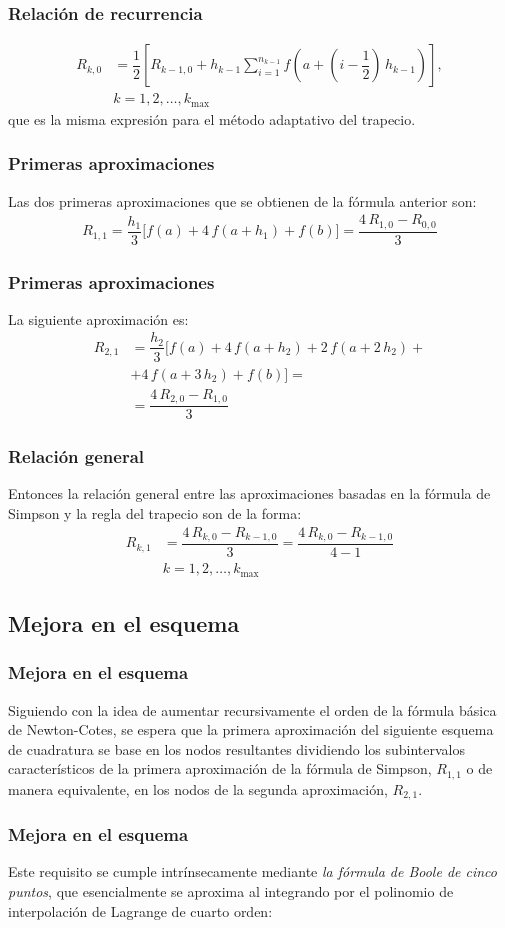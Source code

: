 \begin{frame}
\frametitle{Relación de recurrencia}
\begin{align*}
R_{k,0} &= \dfrac{1}{2} \left[ R_{k-1, 0} + h_{k-1} \sum_{i=1}^{n_{k-1}} f  \left(a + \left( i - \dfrac{1}{2} \right) \, h_{k-1} \right) \right], \\[0.5em]
&k = 1, 2,\ldots, k_{\max}
\end{align*}
que es la misma expresión para el método adaptativo del trapecio.
\end{frame}
\begin{frame}
\frametitle{Primeras aproximaciones}
Las dos primeras aproximaciones que se obtienen de la fórmula anterior son:
\begin{align*}
R_{1, 1} = \dfrac{h_{1}}{3} \bigg[ f(a) + 4 \, f(a + h_{1}) + f(b) \bigg] = \dfrac{4 \, R_{1, 0} - R_{0, 0}}{3}
\end{align*}
\end{frame}
\begin{frame}
\frametitle{Primeras aproximaciones}
La siguiente aproximación es:
\begin{align*}
R_{2, 1} &= \dfrac{h_{2}}{3} \bigg[ f(a) + 4 \, f(a + h_{2}) + 2 \, f(a + 2 \, h_{2}) + \\[0.5em]
&+ 4 \, f(a + 3\, h_{2}) +  f(b) \bigg] = \\[0.5em]
&= \dfrac{4 \, R_{2, 0} - R_{1, 0}}{3}
\end{align*}
\end{frame}
\begin{frame}
\frametitle{Relación general}
Entonces la relación general entre las aproximaciones basadas en la fórmula de Simpson y la regla del trapecio son de la forma:
\begin{align*}
R_{k, 1} &= \dfrac{4 \, R_{k, 0} - R_{k-1, 0}}{3} = \dfrac{4 \, R_{k, 0} - R_{k-1, 0}}{4 -1} \\[0.5em]
&k = 1, 2, \ldots, k_{\max}
\end{align*}
\end{frame}
\subsection*{Mejora en el esquema}
\begin{frame}
\frametitle{Mejora en el esquema}
Siguiendo con la idea de aumentar recursivamente el orden de la fórmula básica de Newton-Cotes, se espera que la primera aproximación del siguiente esquema de cuadratura se base en los nodos resultantes dividiendo los subintervalos característicos de la primera aproximación de la fórmula de Simpson, $R_{1,1}$ o de manera equivalente, en los nodos de la segunda aproximación, $R_{2,1}$.
\end{frame}
\begin{frame}
\frametitle{Mejora en el esquema}
Este requisito se cumple intrínsecamente mediante \emph{la fórmula de Boole de cinco puntos}, que esencialmente se aproxima al integrando por el polinomio de interpolación de Lagrange de cuarto orden:
\end{frame}
